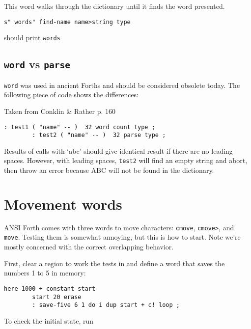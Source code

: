 This word walks through the dictionary until it finds the word presented. 

\begin{lstlisting}[frame=lines]
        s" words" find-name name>string type
\end{lstlisting}

\noindent should print \texttt{words}


\subsection{\texttt{word} vs \texttt{parse}}

\texttt{word} was used in ancient Forths and should be
considered obsolete today. The following piece of code shows the differences:

Taken from Conklin \& Rather p. 160

\begin{lstlisting}[frame=lines]
        : test1 ( "name" -- )  32 word count type ; 
        : test2 ( "name" -- )  32 parse type ; 
\end{lstlisting}

\noindent Results of calls with `abc' should give identical result if there are no
leading spaces. However, with leading spaces, \texttt{test2} will find an empty string
and abort, then throw an error because ABC will not be found in the dictionary.

\section{Movement words}

ANSI Forth comes with three words to move characters:
\texttt{cmove},
\texttt{cmove>}, and
\texttt{move}. Testing them is somewhat annoying, but
this is how to start. Note we're mostly concerned with the correct overlapping
behavior. 

First, clear a region to work the tests in and define a word that saves the
numbers 1 to 5 in memory:

\begin{lstlisting}[frame=lines]
        here 1000 + constant start
        start 20 erase
        : save-five 6 1 do i dup start + c! loop ;
\end{lstlisting}

\noindent To check the initial state, run

